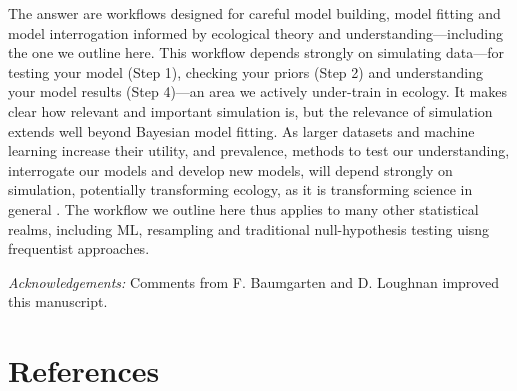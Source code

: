 \documentclass[11pt]{article}
\begin{document}
{The answer are workflows designed for careful model building, model fitting and model interrogation informed by ecological theory and understanding---including the one we outline here. %
This workflow depends strongly on simulating data---for testing your model (Step 1), checking your priors (Step 2) and understanding your model results (Step 4)---an area we actively under-train in ecology. It makes clear how relevant and important simulation is, but the relevance of simulation extends well beyond Bayesian model fitting. As larger datasets and machine learning increase their utility, and prevalence, methods to test our understanding, interrogate our models and develop new models, will depend strongly on simulation, potentially transforming ecology, as it is transforming science in general \citep{flynn2022digitaltwin,kuntz2022,oren2017}. The workflow we outline here thus applies to many other statistical realms, including ML, resampling and traditional null-hypothesis testing uisng frequentist approaches.

\emph{Acknowledgements:} Comments from F. Baumgarten and D. Loughnan improved this manuscript. 

\newpage
\section{References}
\vspace{-5ex}


}
\end{document}
